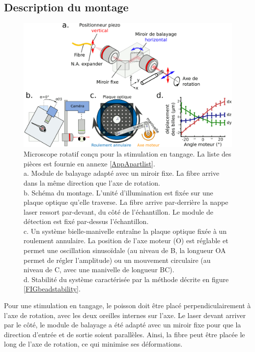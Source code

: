 \subsection{Description du montage}

\begin{figure}[b!]
    \centering
    \includegraphics[width=\textwidth]{./files/miniature_light-sheet_tilt.svg.png}
    \caption{Microscope rotatif conçu pour la stimulation en tangage. La liste des pièces est fournie en annexe \ref{AppApartlist}.
    \\a. Module de balayage adapté avec un miroir fixe. La fibre arrive dans la même direction que l'axe de rotation.
    \\b. Schéma du montage. L'unité d'illumination est fixée sur une plaque optique qu'elle traverse. La fibre arrive par-derrière la nappe laser ressort par-devant, du côté de l'échantillon. Le module de détection est fixé par-dessus l'échantillon.
    \\c. Un système bielle-manivelle entraîne la plaque optique fixée à un roulement annulaire. La position de l'axe moteur (O) est réglable et permet une oscillation sinusoïdale (au niveau de B, la longueur OA permet de régler l'amplitude) ou un mouvement circulaire (au niveau de C, avec une manivelle de longueur BC).
    \\d. Stabilité du système caractérisée par la méthode décrite en figure \ref{FIGbeadstability}.
    \label{FIGtiltlightsheet}}
    \end{figure}

Pour une stimulation en tangage, le poisson doit être placé perpendiculairement à l'axe de rotation, avec les deux oreilles internes sur l'axe. Le laser devant arriver par le côté, le module de balayage a été adapté avec un miroir fixe pour que la direction d'entrée et de sortie soient parallèles. Ainsi, la fibre peut être placée le long de l'axe de rotation, ce qui minimise ses déformations.

